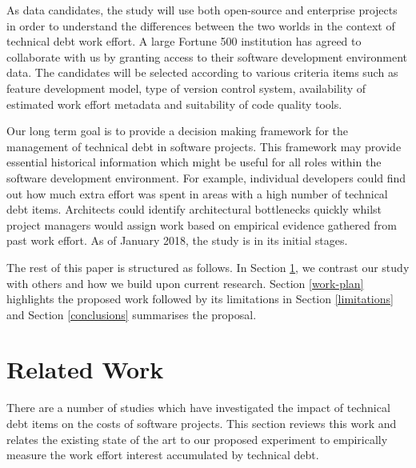 As data candidates, the study will use both open-source and enterprise projects
in order to understand the differences between the two worlds in the context of
technical debt work effort. A large Fortune 500 institution has agreed to
collaborate with us by granting access to their software development environment
data. The candidates will be selected according to various criteria items such
as feature development model, type of version control system, availability of
estimated work effort metadata and suitability of code quality tools. 

Our long term goal is to provide a decision making framework for the management
of technical debt in software projects. This framework may provide essential
historical information which might be useful for all roles within the software
development environment. For example, individual developers could find out how
much extra effort was spent in areas with a high number of technical debt items.
Architects could identify architectural bottlenecks quickly whilst project
managers would assign work based on empirical evidence gathered from past work
effort. As of January 2018, the study is in its initial stages.

The rest of this paper is structured as follows.  In Section \ref{related-work},
we contrast our study with others and how we build upon current research.
Section \ref{work-plan} highlights the proposed work followed by its limitations
in Section \ref{limitations} and Section \ref{conclusions} summarises the
proposal.

\section{Related Work}
\label{related-work}

There are a number of studies which have investigated the impact of technical
debt items on the costs of software projects.  This section reviews this work
and relates the existing state of the art to our proposed experiment to
empirically measure the work effort interest accumulated by technical debt.

